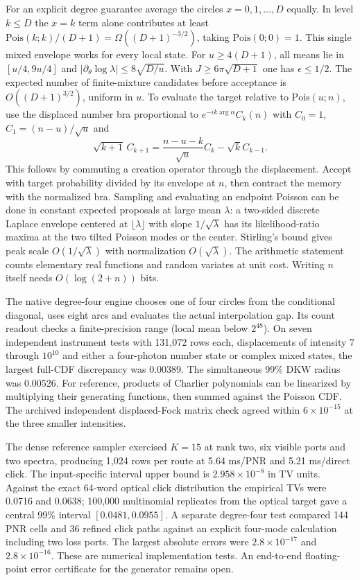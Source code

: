 \documentclass[11pt]{article}
\begin{document}
For an explicit degree guarantee average the circles $x=0,1,\ldots,D$ equally. In level $k\le D$ the $x=k$ term alone contributes at least $\mathrm{Pois}(k;k)/(D+1)=\Omega((D+1)^{-3/2})$, taking $\mathrm{Pois}(0;0)=1$. This single mixed envelope works for every local state. For $u\ge4(D+1)$, all means lie in $[u/4,9u/4]$ and $|\partial_\theta\log\lambda|\le8\sqrt{D/u}$. With $J\ge6\pi\sqrt{D+1}$ one has $\epsilon\le1/2$. The expected number of finite-mixture candidates before acceptance is $O((D+1)^{3/2})$, uniform in $u$. To evaluate the target relative to $\mathrm{Pois}(u;n)$, use the displaced number bra proportional to $e^{-ik\arg\alpha}C_k(n)$ with $C_0=1$, $C_1=(n-u)/\sqrt u$ and
\[
 \sqrt{k+1}\, C_{k+1}=\frac{n-u-k}{\sqrt u}C_k-\sqrt{k}C_{k-1}.
\]
This follows by commuting a creation operator through the displacement. Accept with target probability divided by its envelope at $n$, then contract the memory with the normalized bra. Sampling and evaluating an endpoint Poisson can be done in constant expected proposals at large mean $\lambda$: a two-sided discrete Laplace envelope centered at $\lfloor\lambda\rfloor$ with slope $1/\sqrt\lambda$ has its likelihood-ratio maxima at the two tilted Poisson modes or the center. Stirling's bound gives peak scale $O(1/\sqrt\lambda)$ with normalization $O(\sqrt\lambda)$. The arithmetic statement counts elementary real functions and random variates at unit cost. Writing $n$ itself needs $O(\log(2+n))$ bits.

The native degree-four engine chooses one of four circles from the conditional diagonal, uses eight arcs and evaluates the actual interpolation gap. Its count readout checks a finite-precision range (local mean below $2^{48}$). On seven independent instrument tests with 131,072 rows each, displacements of intensity 7 through $10^{10}$ and either a four-photon number state or complex mixed states, the largest full-CDF discrepancy was 0.00389. The simultaneous 99\% DKW radius was 0.00526. For reference, products of Charlier polynomials can be linearized by multiplying their generating functions, then summed against the Poisson CDF. The archived independent displaced-Fock matrix check agreed within $6\times10^{-15}$ at the three smaller intensities.

The dense reference sampler exercised $K=15$ at rank two, six visible ports and two spectra, producing 1,024 rows per route at 5.64 ms/PNR and 5.21 ms/direct click. The input-specific interval upper bound is $2.958\times10^{-8}$ in TV units. Against the exact 64-word optical click distribution the empirical TVs were 0.0716 and 0.0638; 100,000 multinomial replicates from the optical target gave a central 99\% interval $[0.0481,0.0955]$. A separate degree-four test compared 144 PNR cells and 36 refined click paths against an explicit four-mode calculation including two loss ports. The largest absolute errors were $2.8\times10^{-17}$ and $2.8\times10^{-16}$. These are numerical implementation tests. An end-to-end floating-point error certificate for the generator remains open.
\end{document}
